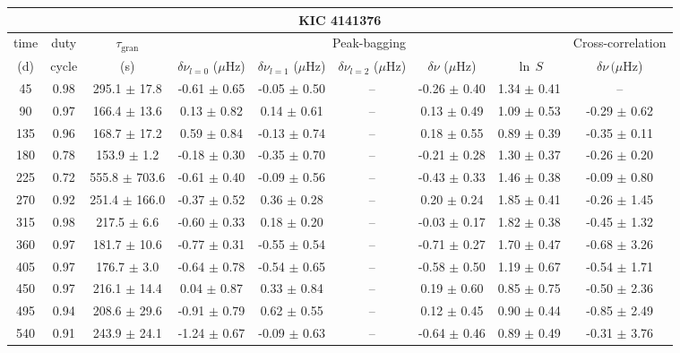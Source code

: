 \documentclass[twocolumn]{aastex61}%
\begin{document}
\begin{table*}[ht]\centering\fontsize{9.}{7.}\selectfont
\begin{tabular}{ccc|ccccc|c}
\multicolumn{9}{c}{KIC 4141376}\\ \hline\hline
time & duty & $\tau_\text{gran}$ &\multicolumn{5}{c|}{Peak-bagging}&Cross-correlation\\
(d)& cycle & (s)&$\delta\nu_{l=0}$ ($\mu$Hz) & $\delta\nu_{l=1}$ ($\mu$Hz) & $\delta\nu_{l=2}$ ($\mu$Hz) & $\delta\nu$ ($\mu$Hz)& $\ln\,S$ & $\delta\nu\,(\mu$Hz)\\\hline
45 & 0.98 & 295.1 $\pm$ 17.8 & -0.61 $\pm$ 0.65 & -0.05 $\pm$ 0.50 & -- & -0.26 $\pm$ 0.40 & 1.34 $\pm$ 0.41 & --\\
90 & 0.97 & 166.4 $\pm$ 13.6 & 0.13 $\pm$ 0.82 & 0.14 $\pm$ 0.61 & -- & 0.13 $\pm$ 0.49 & 1.09 $\pm$ 0.53 & -0.29 $\pm$ 0.62\\
135 & 0.96 & 168.7 $\pm$ 17.2 & 0.59 $\pm$ 0.84 & -0.13 $\pm$ 0.74 & -- & 0.18 $\pm$ 0.55 & 0.89 $\pm$ 0.39 & -0.35 $\pm$ 0.11\\
180 & 0.78 & 153.9 $\pm$ 1.2 & -0.18 $\pm$ 0.30 & -0.35 $\pm$ 0.70 & -- & -0.21 $\pm$ 0.28 & 1.30 $\pm$ 0.37 & -0.26 $\pm$ 0.20\\
225 & 0.72 & 555.8 $\pm$ 703.6 & -0.61 $\pm$ 0.40 & -0.09 $\pm$ 0.56 & -- & -0.43 $\pm$ 0.33 & 1.46 $\pm$ 0.38 & -0.09 $\pm$ 0.80\\
270 & 0.92 & 251.4 $\pm$ 166.0 & -0.37 $\pm$ 0.52 & 0.36 $\pm$ 0.28 & -- & 0.20 $\pm$ 0.24 & 1.85 $\pm$ 0.41 & -0.26 $\pm$ 1.45\\
315 & 0.98 & 217.5 $\pm$ 6.6 & -0.60 $\pm$ 0.33 & 0.18 $\pm$ 0.20 & -- & -0.03 $\pm$ 0.17 & 1.82 $\pm$ 0.38 & -0.45 $\pm$ 1.32\\
360 & 0.97 & 181.7 $\pm$ 10.6 & -0.77 $\pm$ 0.31 & -0.55 $\pm$ 0.54 & -- & -0.71 $\pm$ 0.27 & 1.70 $\pm$ 0.47 & -0.68 $\pm$ 3.26\\
405 & 0.97 & 176.7 $\pm$ 3.0 & -0.64 $\pm$ 0.78 & -0.54 $\pm$ 0.65 & -- & -0.58 $\pm$ 0.50 & 1.19 $\pm$ 0.67 & -0.54 $\pm$ 1.71\\
450 & 0.97 & 216.1 $\pm$ 14.4 & 0.04 $\pm$ 0.87 & 0.33 $\pm$ 0.84 & -- & 0.19 $\pm$ 0.60 & 0.85 $\pm$ 0.75 & -0.50 $\pm$ 2.36\\
495 & 0.94 & 208.6 $\pm$ 29.6 & -0.91 $\pm$ 0.79 & 0.62 $\pm$ 0.55 & -- & 0.12 $\pm$ 0.45 & 0.90 $\pm$ 0.44 & -0.85 $\pm$ 2.49\\
540 & 0.91 & 243.9 $\pm$ 24.1 & -1.24 $\pm$ 0.67 & -0.09 $\pm$ 0.63 & -- & -0.64 $\pm$ 0.46 & 0.89 $\pm$ 0.49 & -0.31 $\pm$ 3.76\\

\end{tabular}
\end{table*}
\end{document}

